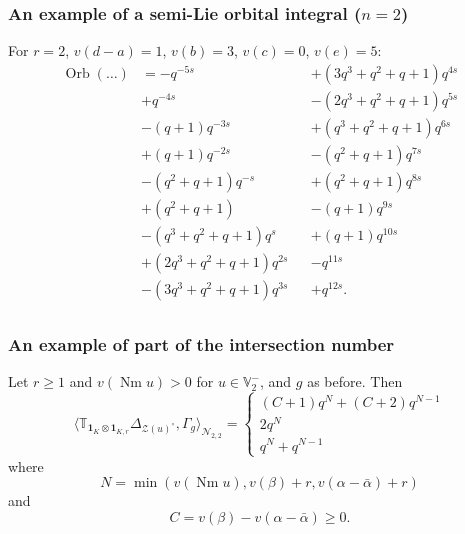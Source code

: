 \documentclass[11pt]{beamer}
\DeclareMathOperator{\Nm}{Nm}
\DeclareMathOperator{\Orb}{Orb}
\newcommand{\VV}{\mathbb{V}}
\newcommand{\RZ}{\mathcal{N}}
\newcommand{\ZD}{\mathcal{Z}}
\begin{document}
\begin{frame}
  \frametitle{An example of a semi-Lie orbital integral ($n=2$)}
  For $r=2$, $v(d-a)=1$, $v(b)=3$, $v(c)=0$, $v(e)=5$:
  \begin{align*}
    \Orb(\dots) &= -q^{-5s} &&+ (3q^3+q^2+q+1) q^{4s} \\
    &+ q^{-4s} &&- (2q^3+q^2+q+1) q^{5s} \\
    &- (q+1) q^{-3s} &&+ (q^3+q^2+q+1) q^{6s} \\
    &+ (q+1) q^{-2s} &&- (q^2+q+1) q^{7s} \\
    &- (q^2+q+1) q^{-s} &&+ (q^2+q+1) q^{8s} \\
    &+ (q^2+q+1) &&- (q+1) q^{9s}\\
    &- (q^3+q^2+q+1) q^{s} &&+ (q+1)q^{10s} \\
    &+ (2q^3+q^2+q+1) q^{2s} &&- q^{11s} \\
    &- (3q^3+q^2+q+1) q^{3s} &&+ q^{12s}. \\
  \end{align*}
\end{frame}

\begin{frame}
  \frametitle{An example of part of the intersection number}
  Let $r \ge 1$ and $v(\Nm u) > 0$ for $u \in \VV_2^-$, and $g$ as before.
  Then
  \[ \Big\langle \mathbb{T}_{\mathbf{1}_K \otimes \mathbf{1}_{K, r}}
    \Delta_{\ZD(u)^\circ}, \Gamma_g \Big\rangle_{\RZ_{2,2}}
    =
    \begin{cases}
      (C+1) q^{N} + (C+2) q^{N-1} \\
      2q^N \\
      q^N + q^{N-1}
    \end{cases}
  \]
  where
  \[ N = \min(v(\Nm u), v(\beta) + r, v(\alpha-\bar\alpha) + r) \]
  and
  \[ C = v(\beta) - v(\alpha - \bar\alpha) \ge 0. \]
\end{frame}
\end{document}
